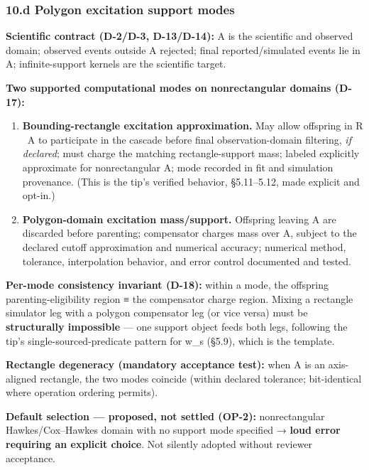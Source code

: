 \documentclass[
  10pt,
]{article}
\providecommand{\tightlist}{%
  \setlength{\itemsep}{0pt}\setlength{\parskip}{0pt}}
\begin{document}
\hypertarget{d-polygon-excitation-support-modes}{%
\subsubsection{10.d Polygon excitation support modes}\label{d-polygon-excitation-support-modes}}

\textbf{Scientific contract (D-2/D-3, D-13/D-14):} A is the scientific and observed domain; observed events outside A rejected; final reported/simulated events lie in A; infinite-support kernels are the scientific target.

\textbf{Two supported computational modes on nonrectangular domains (D-17):}

\begin{enumerate}
\def\labelenumi{\arabic{enumi}.}
\tightlist
\item
  \textbf{Bounding-rectangle excitation approximation.} May allow offspring in R ~A to participate in the cascade before final observation-domain filtering, \emph{if declared}; must charge the matching rectangle-support mass; labeled explicitly approximate for nonrectangular A; mode recorded in fit and simulation provenance. (This is the tip's verified behavior, §5.11--5.12, made explicit and opt-in.)
\item
  \textbf{Polygon-domain excitation mass/support.} Offspring leaving A are discarded before parenting; compensator charges mass over A, subject to the declared cutoff approximation and numerical accuracy; numerical method, tolerance, interpolation behavior, and error control documented and tested.
\end{enumerate}

\textbf{Per-mode consistency invariant (D-18):} within a mode, the offspring parenting-eligibility region ≡ the compensator charge region. Mixing a rectangle simulator leg with a polygon compensator leg (or vice versa) must be \textbf{structurally impossible} --- one support object feeds both legs, following the tip's single-sourced-predicate pattern for w\_s (§5.9), which is the template.

\textbf{Rectangle degeneracy (mandatory acceptance test):} when A is an axis-aligned rectangle, the two modes coincide (within declared tolerance; bit-identical where operation ordering permits).

\textbf{Default selection --- proposed, not settled (OP-2):} nonrectangular Hawkes/Cox--Hawkes domain with no support mode specified → \textbf{loud error requiring an explicit choice}. Not silently adopted without reviewer acceptance.
\end{document}
